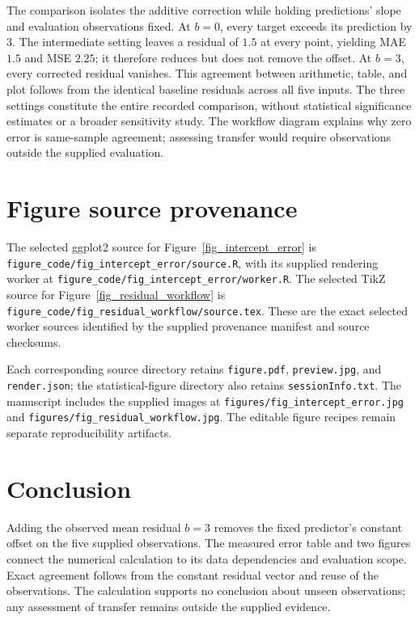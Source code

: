 \documentclass[11pt]{article}
\begin{document}
The comparison isolates the additive correction while holding predictions' slope and evaluation observations fixed. At $b=0$, every target exceeds its prediction by $3$. The intermediate setting leaves a residual of $1.5$ at every point, yielding MAE $1.5$ and MSE $2.25$; it therefore reduces but does not remove the offset. At $b=3$, every corrected residual vanishes. This agreement between arithmetic, table, and plot follows from the identical baseline residuals across all five inputs. The three settings constitute the entire recorded comparison, without statistical significance estimates or a broader sensitivity study. The workflow diagram explains why zero error is same-sample agreement; assessing transfer would require observations outside the supplied evaluation.

\section*{Figure source provenance}

The selected ggplot2 source for Figure~\ref{fig_intercept_error} is
\texttt{figure\_code/fig\_intercept\_error/source.R}, with its supplied rendering worker at
\texttt{figure\_code/fig\_intercept\_error/worker.R}.
The selected TikZ source for Figure~\ref{fig_residual_workflow} is
\texttt{figure\_code/fig\_residual\_workflow/source.tex}.
These are the exact selected worker sources identified by the supplied provenance manifest and source checksums.

Each corresponding source directory retains \texttt{figure.pdf},
\texttt{preview.jpg}, and \texttt{render.json}; the statistical-figure directory also retains \texttt{sessionInfo.txt}.
The manuscript includes the supplied images at
\texttt{figures/fig\_intercept\_error.jpg} and
\texttt{figures/fig\_residual\_workflow.jpg}.
The editable figure recipes remain separate reproducibility artifacts.

\clearpage
\section{Conclusion}
Adding the observed mean residual $b=3$ removes the fixed predictor's constant offset on the five supplied observations. The measured error table and two figures connect the numerical calculation to its data dependencies and evaluation scope. Exact agreement follows from the constant residual vector and reuse of the observations. The calculation supports no conclusion about unseen observations; any assessment of transfer remains outside the supplied evidence.
\end{document}
